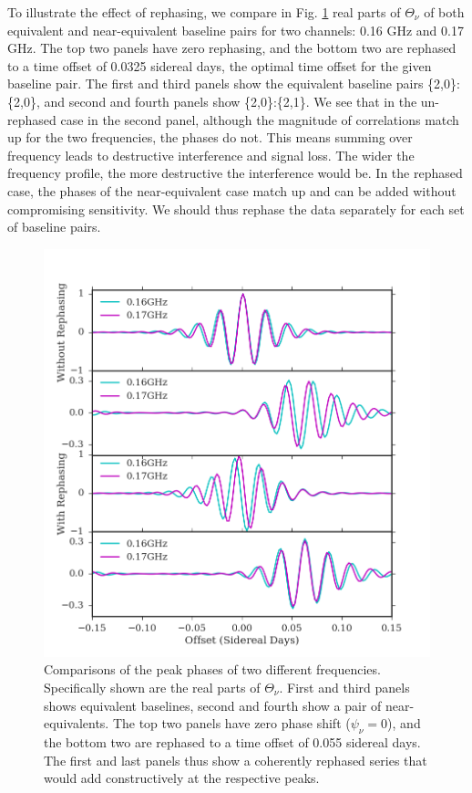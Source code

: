 \documentclass[twocolumn,apj,numberedappendix]{emulateapj}
\renewcommand\[{\begin{equation}}
\renewcommand\]{\end{equation}}
\begin{document}
 

To illustrate the effect of rephasing, we compare in Fig. \ref{fig:freqdiff} real parts of $\Theta_{\nu}$ of both equivalent and near-equivalent baseline pairs for two channels: 0.16 GHz and 0.17 GHz. The top two panels have zero rephasing, and the bottom two are rephased to a time offset of 0.0325 sidereal days, the optimal time offset for the given baseline pair. The first and third panels show the equivalent baseline pairs \{2,0\}:\{2,0\}, and second and fourth panels show \{2,0\}:\{2,1\}. We see that in the un-rephased case in the second panel, although the magnitude of correlations match up for the two frequencies, the phases do not. This means summing over frequency leads to destructive interference and signal loss. The wider the frequency profile, the more destructive the interference would be. In the rephased case, the phases of the near-equivalent case match up and can be added without compromising sensitivity. We should thus rephase the data separately for each set of baseline pairs. 

\begin{figure}[H]
\includegraphics[width=1.1\linewidth]{rephs}

\caption{Comparisons of the peak phases of two different frequencies. Specifically shown are the real parts of $\Theta_{\nu}$. First and third panels shows equivalent baselines, second and fourth show a pair of near-equivalents. The top two panels have zero phase shift ($\psi_{\nu}=0$), and the bottom two are rephased to a time offset of 0.055 sidereal days. The first and last panels thus show a coherently rephased series that would add constructively at the respective peaks. }
\label{fig:freqdiff}
\end{figure}
\end{document}
